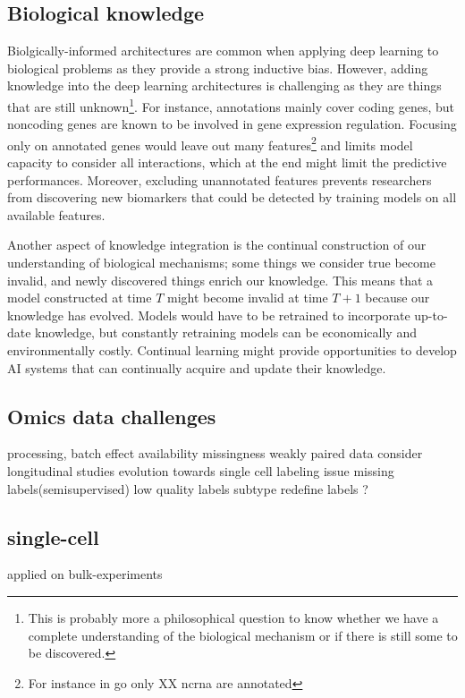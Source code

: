 \documentclass[../main.tex]{subfiles}
\begin{document}
	\subsection{Biological knowledge}\label{sec:persp_knwoledged}
		Biolgically-informed architectures are common when applying deep learning to biological problems as they provide a strong inductive bias.
		However, adding knowledge into the deep learning architectures is challenging as they are things that are still unknown\footnote{This is probably more a philosophical question to know whether we have a complete understanding of the biological mechanism or if there is still some to be discovered.}.
		For instance, annotations mainly cover coding genes, but noncoding genes are known to be involved in gene expression regulation.
		Focusing only on annotated genes would leave out many features\footnote{For instance in \gls{go} only XX \gls{ncrna} are annotated} and limits model capacity to consider all interactions, which at the end might limit the predictive performances.
		Moreover, excluding unannotated features prevents researchers from discovering new biomarkers that could be detected by training models on all available features.

		Another aspect of knowledge integration is the continual construction of our understanding of biological mechanisms; some things we consider true become invalid, and newly discovered things enrich our knowledge.
		This means that a model constructed at time \(T\) might become invalid at time \(T+1\) because our knowledge has evolved.
		Models would have to be retrained to incorporate up-to-date knowledge, but constantly retraining models can be economically and environmentally costly.
		Continual learning might provide opportunities to develop AI systems that can continually acquire and update their knowledge\cite{wang2024comprehensivesurveycontinuallearning}.

	\subsection{Omics data challenges}
		processing, batch effect
		availability missingness
		weakly paired data
		consider longitudinal studies
		evolution towards single cell
		labeling issue missing labels(semisupervised) low quality labels
		subtype redefine labels ?

	\subsection{single-cell}
		applied on bulk-experiments
\end{document}
